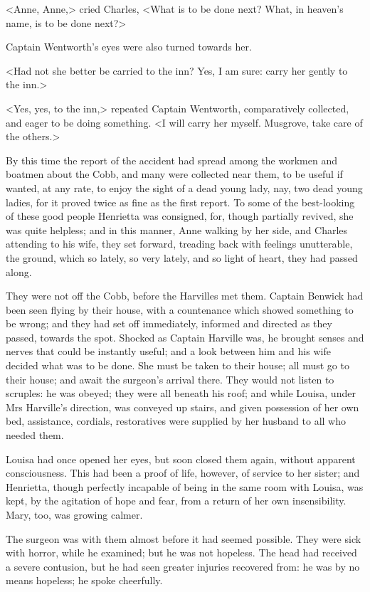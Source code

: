 <Anne, Anne,> cried Charles, <What is to be done next? What, in heaven's name, is to be done next?>

Captain Wentworth's eyes were also turned towards her.

<Had not she better be carried to the inn? Yes, I am sure: carry her gently to the inn.>

<Yes, yes, to the inn,> repeated Captain Wentworth, comparatively collected, and eager to be doing something. <I will carry her myself. Musgrove, take care of the others.>

By this time the report of the accident had spread among the workmen and boatmen about the Cobb, and many were collected near them, to be useful if wanted, at any rate, to enjoy the sight of a dead young lady, nay, two dead young ladies, for it proved twice as fine as the first report. To some of the best-looking of these good people Henrietta was consigned, for, though partially revived, she was quite helpless; and in this manner, Anne walking by her side, and Charles attending to his wife, they set forward, treading back with feelings unutterable, the ground, which so lately, so very lately, and so light of heart, they had passed along.

They were not off the Cobb, before the Harvilles met them. Captain Benwick had been seen flying by their house, with a countenance which showed something to be wrong; and they had set off immediately, informed and directed as they passed, towards the spot. Shocked as Captain Harville was, he brought senses and nerves that could be instantly useful; and a look between him and his wife decided what was to be done. She must be taken to their house; all must go to their house; and await the surgeon's arrival there. They would not listen to scruples: he was obeyed; they were all beneath his roof; and while Louisa, under Mrs Harville's direction, was conveyed up stairs, and given possession of her own bed, assistance, cordials, restoratives were supplied by her husband to all who needed them.

Louisa had once opened her eyes, but soon closed them again, without apparent consciousness. This had been a proof of life, however, of service to her sister; and Henrietta, though perfectly incapable of being in the same room with Louisa, was kept, by the agitation of hope and fear, from a return of her own insensibility. Mary, too, was growing calmer.

The surgeon was with them almost before it had seemed possible. They were sick with horror, while he examined; but he was not hopeless. The head had received a severe contusion, but he had seen greater injuries recovered from: he was by no means hopeless; he spoke cheerfully.

